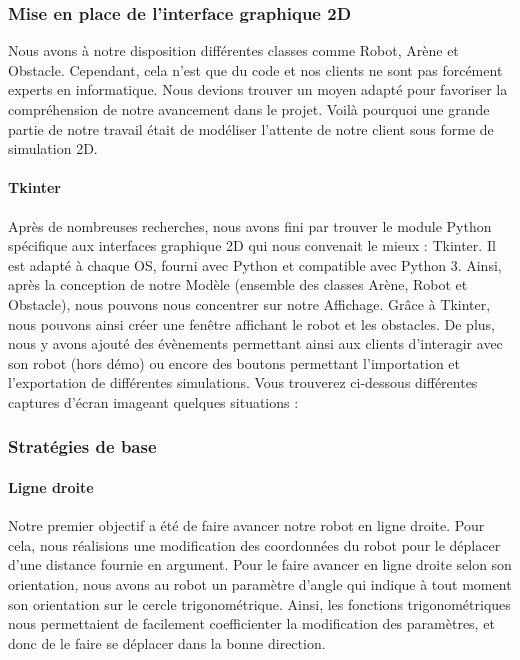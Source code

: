 \documentclass[12pt]{article}
\begin{document}
\subsubsection{Mise en place de l'interface graphique 2D}
Nous avons à notre disposition différentes classes comme Robot, Arène et Obstacle. Cependant,  cela n’est que du code et nos clients ne sont pas forcément experts en informatique. Nous devions trouver un moyen adapté pour favoriser la compréhension de notre avancement dans le projet. Voilà pourquoi une grande partie de notre travail était de modéliser l’attente de notre client sous forme de simulation 2D.

\paragraph{Tkinter\\}
Après de nombreuses recherches, nous avons fini par trouver le module Python spécifique aux interfaces graphique 2D qui nous convenait le mieux : Tkinter. Il est adapté à chaque OS, fourni avec Python et compatible avec Python 3. Ainsi, après la conception de notre Modèle (ensemble des classes Arène, Robot et Obstacle), nous pouvons nous concentrer sur notre Affichage.
Grâce à Tkinter, nous pouvons ainsi créer une fenêtre affichant le robot et les obstacles. De plus, nous y avons ajouté des évènements permettant ainsi aux clients d’interagir avec son robot (hors démo) ou encore des boutons permettant l’importation et l’exportation de différentes simulations.
Vous trouverez ci-dessous différentes captures d’écran imageant quelques situations :

\subsubsection{Stratégies de base}
\paragraph{Ligne droite\\}
Notre premier objectif a été de faire avancer notre robot en ligne droite. Pour cela, nous réalisions une modification des coordonnées du robot pour le déplacer d'une distance fournie en argument. Pour le faire avancer en ligne droite selon son orientation, nous avons au robot un paramètre d'angle qui indique à tout moment son orientation sur le cercle trigonométrique. Ainsi, les fonctions trigonométriques nous permettaient de facilement coefficienter la modification des paramètres, et donc de le faire se déplacer dans la bonne direction.
\end{document}
